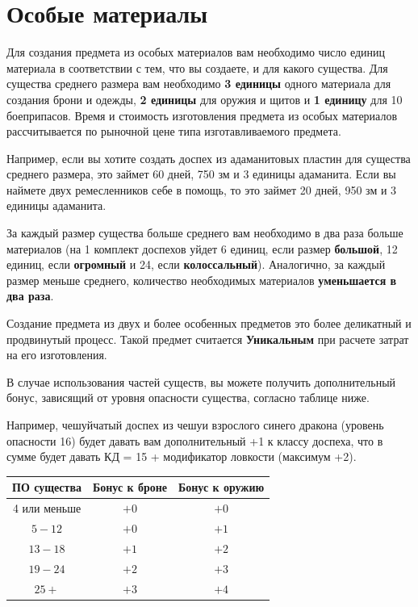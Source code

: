 \documentclass[a4paper, 9pt, twocolumn]{book}
\begin{document}
	\section{Особые материалы}
	
	Для создания предмета из особых материалов вам необходимо число единиц материала в соответствии с тем, что вы создаете, и для какого существа. Для существа среднего размера вам необходимо \textbf{3 единицы} одного материала для создания брони и одежды, \textbf{2 единицы} для оружия и щитов и \textbf{1 единицу} для 10 боеприпасов. Время и стоимость изготовления предмета из особых материалов рассчитывается по рыночной цене типа изготавливаемого предмета.
	
	Например, если вы хотите создать доспех из адаманитовых пластин для существа среднего размера, это займет 60 дней, 750 зм и 3 единицы адаманита. Если вы наймете двух ремесленников себе в помощь, то это займет 20 дней, 950 зм и 3 единицы адаманита.
	
	За каждый размер существа больше среднего вам необходимо в два раза больше материалов (на 1 комплект доспехов уйдет 6 единиц, если размер \textbf{большой}, 12 единиц, если \textbf{огромный} и 24, если \textbf{колоссальный}). Аналогично, за каждый размер меньше среднего, количество необходимых материалов \textbf{уменьшается в два раза}.
	
	Создание предмета из двух и более особенных предметов это более деликатный и продвинутый процесс. Такой предмет считается \textbf{Уникальным} при расчете затрат на его изготовления.
	
	В случае использования частей существ, вы можете получить дополнительный бонус, зависящий от уровня опасности существа, согласно таблице ниже.
	
	Например, чешуйчатый доспех из чешуи взрослого синего дракона (уровень опасности 16) будет давать вам дополнительный +1 к классу доспеха, что в сумме будет давать КД = 15 + модификатор ловкости (максимум +2).
	
	\begin{tabular}{|c|c|c|}
		\hline
		\textbf{ПО существа} & \textbf{Бонус к броне} & \textbf{Бонус к оружию} \\
		\hline
		4 или меньше & $+0$ & $+0$ \\
		\hline
		$5 - 12$ & $+0$ & $+1$ \\
		\hline
		$13 - 18$ & $+1$ & $+2$ \\
		\hline
		$19 - 24$ & $+2$ & $+3$ \\
		\hline
		$25 + $ & $+3$ & $+4$ \\
		\hline
	\end{tabular}
	
\end{document}
